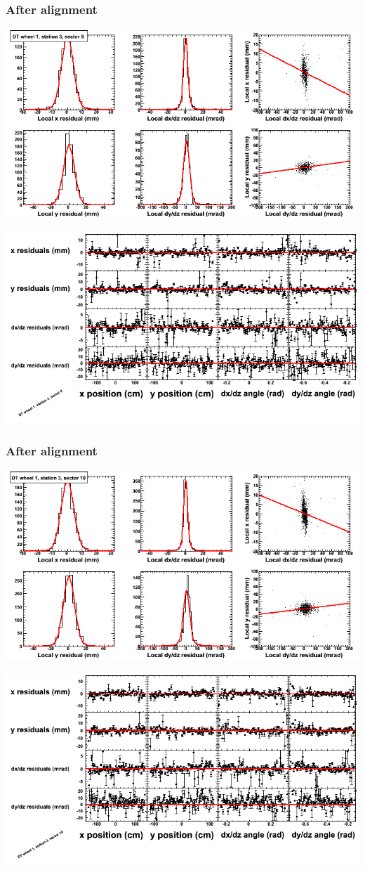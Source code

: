 \documentclass[compress]{beamer}
\begin{document}
\begin{frame}
\frametitle{After alignment}
\includegraphics[width=0.7\linewidth]{NOV4_fitfunctions/MBwhDst3sec09_bellcurves.png}

\includegraphics[width=0.7\linewidth]{NOV4_fitfunctions/MBwhDst3sec09_polynomials.png}
\end{frame}

\begin{frame}
\frametitle{After alignment}
\includegraphics[width=0.7\linewidth]{NOV4_fitfunctions/MBwhDst3sec10_bellcurves.png}

\includegraphics[width=0.7\linewidth]{NOV4_fitfunctions/MBwhDst3sec10_polynomials.png}
\end{frame}
\end{document}
